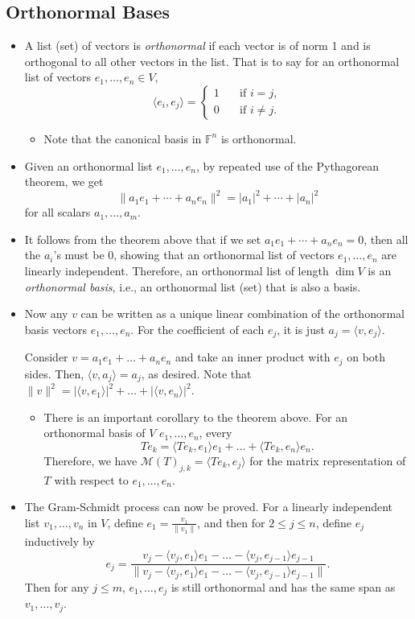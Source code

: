 \documentclass{article}
\newcommand{\F}{\mathbb{F}}
\renewcommand{\d}{\dim}
\newcommand{\inp}[2]{\langle #1, #2 \rangle}
\newcommand{\nm}[1]{\| #1 \|}
\newcommand{\M}{\mathcal{M}}
\begin{document}
\subsection{Orthonormal Bases}
\begin{itemize}
    \item A list (set) of vectors is \textit{orthonormal} if each vector is of norm 1 and is orthogonal to all other vectors in the list. That is to say for an orthonormal list of vectors $e_1,\dots,e_n \in V$,
    \begin{equation*}
    \inp{e_i}{e_j} = 
        \left\{
            \begin{array}{rl}
                1 \quad & \text{if } i = j, \\
                0 \quad & \text{if } i \not= j.
            \end{array}
        \right.
    \end{equation*}
    \begin{itemize}
        \item Note that the canonical basis in $\F^n$ is orthonormal.
    \end{itemize}
    \item Given an orthonormal list $e_1,\dots,e_n$, by repeated use of the Pythagorean theorem, we get $$\nm{a_1 e_1 + \cdots + a_n e_n}^2 = |a_1|^2 + \cdots + |a_n|^2$$ for all scalars $a_1, \dots, a_m$.
    \item It follows from the theorem above that if we set $a_1 e_1 + \cdots + a_n e_n = 0$, then all the $a_i$'s must be 0, showing that an orthonormal list of vectors $e_1,\dots,e_n$ are linearly independent. Therefore, an orthonormal list of length $\d V$ is an \textit{orthonormal basis}, i.e., an orthonormal list (set) that is also a basis.
    \item Now any $v$ can be written as a unique linear combination of the orthonormal basis vectors $e_1,\dots,e_n$. For the coefficient of each $e_j$, it is just $a_j = \inp{v}{e_j}$.
    
    Consider $v = a_1 e_1 + \dots + a_n e_n$ and take an inner product with $e_j$ on both sides. Then, $\inp{v}{a_j} = a_j$, as desired. Note that $\nm{v}^2 = |\inp{v}{e_1}|^2 + \dots + |\inp{v}{e_n}|^2$.
    \begin{itemize}
        \item There is an important corollary to the theorem above. For an orthonormal basis of $V$ $e_1,\dots,e_n$, every $$Te_k = \inp{Te_k}{e_1}e_1 + \dots + \inp{Te_k}{e_n}e_n.$$ Therefore, we have $\M(T)_{j,k} = \inp{Te_k}{e_j}$ for the matrix representation of $T$ with respect to $e_1,\dots,e_n$.
    \end{itemize}
    \item The Gram-Schmidt process can now be proved. For a linearly independent list $v_1,\dots,v_n$ in $V$, define $e_1 = \frac{v_1}{\nm{v_1}}$, and then for $2 \leq j \leq n$, define $e_j$ inductively by $$e_j = \frac{v_j - \inp{v_j}{e_1}e_1 - \dots - \inp{v_j}{e_{j-1}}e_{j-1}}{\nm{v_j - \inp{v_j}{e_1}e_1 - \dots - \inp{v_j}{e_{j-1}}e_{j-1}}}.$$ Then for any $j \leq m$, $e_1, \dots, e_j$ is still orthonormal and has the same span as $v_1,\dots,v_j$. 
    

\end{itemize}
\end{document}
